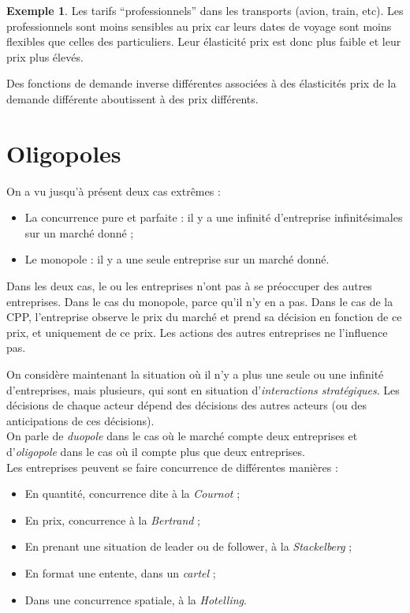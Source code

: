 \documentclass[
  a4paper,
]{book}
\providecommand{\tightlist}{%
  \setlength{\itemsep}{0pt}\setlength{\parskip}{0pt}}
\theoremstyle{definition}
\theoremstyle{definition}
\newtheorem{example}{Exemple}[chapter]
\theoremstyle{definition}
\theoremstyle{definition}
\theoremstyle{remark}
\begin{document}
\begin{example}
Les tarifs ``professionnels'' dans les transports (avion, train, etc).
Les professionnels sont moins sensibles au prix car leurs dates de voyage sont moins flexibles que celles des particuliers.
Leur élasticité prix est donc plus faible et leur prix plus élevés.
\end{example}

Des fonctions de demande inverse différentes associées à des élasticités prix de la demande différente aboutissent à des prix différents.

\hypertarget{oligopoles}{%
\chapter{Oligopoles}\label{oligopoles}}

On a vu jusqu'à présent deux cas extrêmes :

\begin{itemize}
\tightlist
\item
  La concurrence pure et parfaite :
  il y a une infinité d'entreprise infinitésimales sur un marché donné ;
\item
  Le monopole : il y a une seule entreprise sur un marché donné.
\end{itemize}

Dans les deux cas, le ou les entreprises n'ont pas à se préoccuper des autres entreprises.
Dans le cas du monopole, parce qu'il n'y en a pas.
Dans le cas de la CPP, l'entreprise observe le prix du marché et prend sa décision en fonction de ce prix, et uniquement de ce prix.
Les actions des autres entreprises ne l'influence pas.

On considère maintenant la situation où il n'y a plus une seule ou une infinité d'entreprises, mais plusieurs, qui sont en situation d'\emph{interactions stratégiques}.
Les décisions de chaque acteur dépend des décisions des autres acteurs (ou des anticipations de ces décisions).\\
On parle de \emph{duopole} dans le cas où le marché compte deux entreprises et d'\emph{oligopole} dans le cas où il compte plus que deux entreprises.\\
Les entreprises peuvent se faire concurrence de différentes manières :

\begin{itemize}
\tightlist
\item
  En quantité, concurrence dite à la \emph{Cournot} ;
\item
  En prix, concurrence à la \emph{Bertrand} ;
\item
  En prenant une situation de leader ou de follower, à la \emph{Stackelberg} ;
\item
  En format une entente, dans un \emph{cartel} ;
\item
  Dans une concurrence spatiale, à la \emph{Hotelling}.
\end{itemize}
\end{document}

